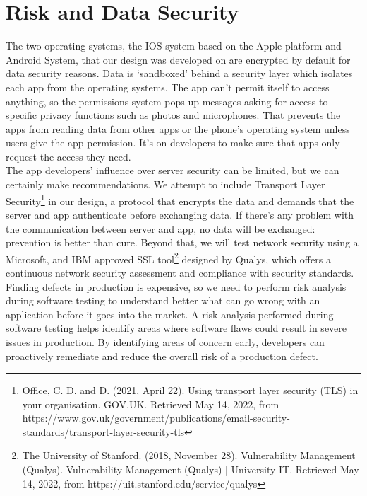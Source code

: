 \section{Risk and Data Security}
The two operating systems, the IOS system based on the Apple platform and Android System, that our design was developed on are encrypted by default for data security reasons. Data is ‘sandboxed’ behind a security layer which isolates each app from the operating systems. The app can’t permit itself to access anything, so the permissions system pops up messages asking for access to specific privacy functions such as photos and microphones. That prevents the apps from reading data from other apps or the phone’s operating system unless users give the app permission. It’s on developers to make sure that apps only request the access they need. 
 \\The app developers’ influence over server security can be limited, but we can certainly make recommendations. We attempt to include Transport Layer Security\footnote{Office, C. D. and D. (2021, April 22). Using transport layer security (TLS) in your organisation. GOV.UK. Retrieved May 14, 2022, from https://www.gov.uk/government/publications/email-security-standards/transport-layer-security-tls} in our design, a protocol that encrypts the data and demands that the server and app authenticate before exchanging data. If there’s any problem with the communication between server and app, no data will be exchanged: prevention is better than cure. Beyond that, we will test network security using a Microsoft, and IBM approved SSL tool\footnote{The University of Stanford. (2018, November 28). Vulnerability Management (Qualys). Vulnerability Management (Qualys) | University IT. Retrieved May 14, 2022, from https://uit.stanford.edu/service/qualys } designed by Qualys, which offers a continuous network security assessment and compliance with security standards.
 \\Finding defects in production is expensive, so we need to perform risk analysis during software testing to understand better what can go wrong with an application before it goes into the market. A risk analysis performed during software testing helps identify areas where software flaws could result in severe issues in production. By identifying areas of concern early, developers can proactively remediate and reduce the overall risk of a production defect.
